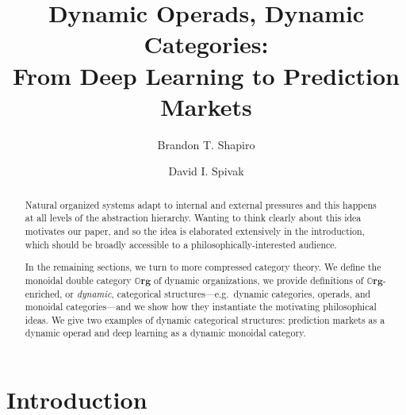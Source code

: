 \documentclass{eptcs}
\theoremstyle{definition}
\theoremstyle{plain}
\newcommand{\Cat}[1]{\textbf{#1}}%
\newcommand{\From}[1]{\xleftarrow{#1}}
\newcommand{\0}{\textsf{0}}
\newcommand{\1}{\tn{\textsf{1}}}
\newcommand{\org}{{\mathbb{O}\Cat{rg}}}
\begin{document}
\title{Dynamic Operads, Dynamic Categories:\\From Deep Learning to Prediction Markets}

\def\titlerunning{Dynamic Categories, Dynamic Operads}
\author{Brandon T. Shapiro \and David I. Spivak}
\def\authorrunning{B.T.\ Shapiro and D.I.\ Spivak}
\date{\vspace{-.2in}}

\maketitle

\begin{abstract}
Natural organized systems adapt to internal and external pressures and this happens at all levels of the abstraction hierarchy. Wanting to think clearly about this idea motivates our paper, and so the idea is elaborated extensively in the introduction, which should be broadly accessible to a philosophically-interested audience.

In the remaining sections, we turn to more compressed category theory. We define the monoidal double category $\org$ of dynamic organizations, we provide definitions of $\org$-enriched, or \emph{dynamic}, categorical structures---e.g.\ dynamic categories, operads, and monoidal categories---and we show how they instantiate the motivating philosophical ideas. We give two examples of dynamic categorical structures: prediction markets as a dynamic operad and deep learning as a dynamic monoidal category.
\end{abstract}

\section{Introduction}
\end{document}
